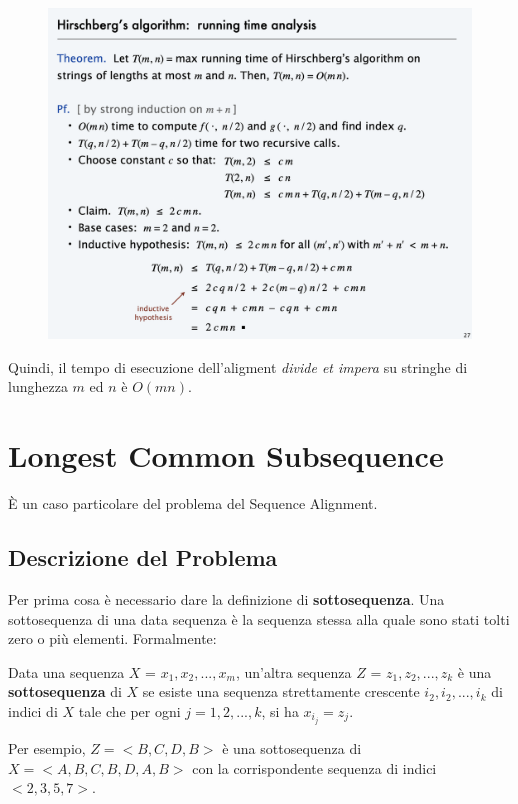 \begin{figure}[H]
\centering
  \includegraphics[width=12cm, keepaspectratio]{Programmazione_dinamica/imgs/hirschberg.png}
\end{figure}

Quindi, il tempo di esecuzione dell'aligment \emph{divide et impera} su
stringhe di lunghezza $m$ ed $n$ è $O(mn)$.


\section{Longest Common Subsequence}

È un caso particolare del problema del Sequence Alignment.

\subsection{Descrizione del Problema}

Per prima cosa è necessario dare la definizione di
\textbf{sottosequenza}. Una sottosequenza di una data sequenza è la
sequenza stessa alla quale sono stati tolti zero o più elementi.
Formalmente:
\begin{myblockquote}
  Data una sequenza $X$ =
  $x_1, x_2, ..., x_m$, un'altra sequenza $Z$ = $z_1, z_2, ..., z_k$
  è una \textbf{sottosequenza} di $X$ se esiste una sequenza
  strettamente crescente $i_2, i_2, ..., i_k$ di indici di $X$ tale
  che per ogni $j = 1, 2, ..., k$, si ha $x_{i_j} = z_j$.
\end{myblockquote}


Per esempio, $Z = <B, C, D, B>$ è una sottosequenza di
$X = < A, B, C, B, D, A, B>$ con la corrispondente sequenza di indici
$<2, 3, 5, 7>$.\\

